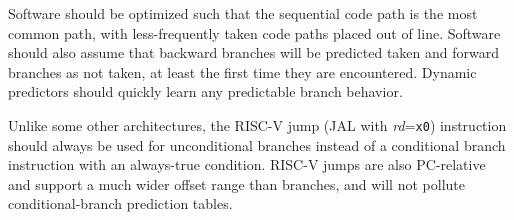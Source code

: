 \begin{formalspec}
  \sailfclBTYPEexecute
\end{formalspec}

Software should be optimized such that the sequential code path is the
most common path, with less-frequently taken code paths placed out of
line.  Software should also assume that backward branches will be
predicted taken and forward branches as not taken, at least the
first time they are encountered.  Dynamic predictors should quickly
learn any predictable branch behavior.

Unlike some other architectures, the RISC-V jump (JAL with {\em
  rd}={\tt x0}) instruction should always be used for unconditional
branches instead of a conditional branch instruction with an
always-true condition.  RISC-V jumps are also PC-relative and support
a much wider offset range than branches, and will not pollute
conditional-branch prediction tables.

